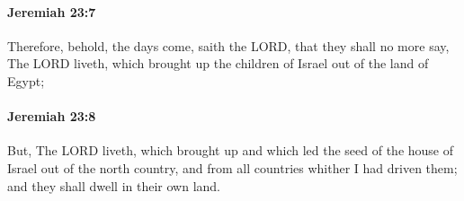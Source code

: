 		\paragraph{Jeremiah 23:7} %
			\label{JEREMIAH-23-7}

			Therefore, behold, the days come, saith the LORD, that they shall no more say, The LORD liveth, which brought up the children of Israel out of the land of Egypt;


		\paragraph{Jeremiah 23:8} %
			\label{JEREMIAH-23-8}

			But, The LORD liveth, which brought up and which led the seed of the house of Israel out of the north country, and from all countries whither I had driven them; and they shall dwell in their own land.


